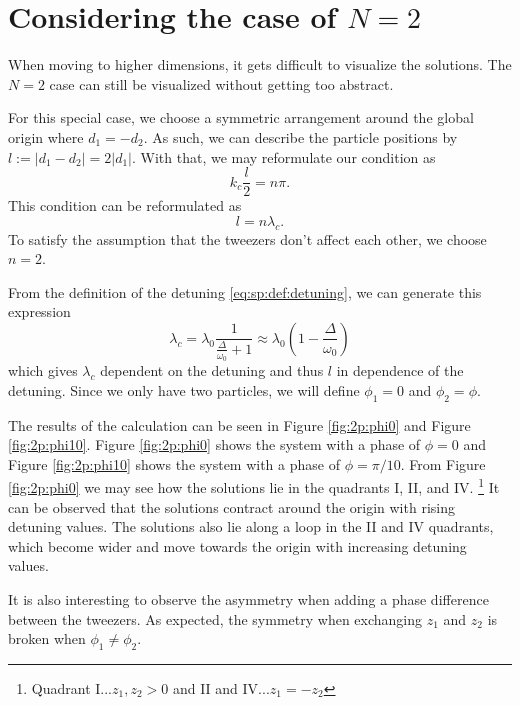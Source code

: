 \chapter{Considering the case of \texorpdfstring{$N=2$}{N=2}}
\label{ch:2p}

When moving to higher dimensions, 
    it gets difficult to visualize the solutions.
The $N=2$ case can still be visualized without getting too abstract.

For this special case, we choose a symmetric arrangement around the global origin where $d_1 = -d_2$.
As such, we can describe the particle positions by $l := |d_1 - d_2| = 2|d_1|$.
With that, we may reformulate our condition as 
\begin{equation}
    k_c \frac l2 = n \pi.
\end{equation}
This condition can be reformulated as
\begin{equation}
    l = n \lambda_c.
\end{equation}
To satisfy the assumption that the tweezers don't affect each other,
    we choose $n=2$.

From the definition of the detuning \eqref{eq:sp:def:detuning},
    we can generate this expression
\begin{equation}
        \lambda_c 
            = \lambda_0 \frac{1}{\frac\Delta{\omega_0} +1} 
            \approx \lambda_0 \left(1 - \frac{\Delta}{\omega_0}\right)
\end{equation}
which gives $\lambda_c$ dependent on the detuning
    and thus $l$ in dependence of the detuning.
Since we only have two particles, we will define $\phi_1 = 0$ and $\phi_2 = \phi$.

The results of the calculation can be seen in Figure \ref{fig:2p:phi0} and Figure \ref{fig:2p:phi10}.
Figure \ref{fig:2p:phi0} shows the system with a phase of $\phi = 0$ 
    and Figure \ref{fig:2p:phi10} shows the system with a phase of $\phi = \pi/10$.
From Figure \ref{fig:2p:phi0} we may see how the solutions lie in the quadrants I, II, and IV. \footnote{
Quadrant I...$z_1, z_2 > 0$ and II and IV...$z_1 = -z_2$
}
It can be observed that the solutions contract around the origin with rising detuning values.
The solutions also lie along a loop in the II and IV quadrants,
    which become wider and move towards the origin with increasing detuning values.

It is also interesting to observe the asymmetry when adding a phase difference between the tweezers.
As expected, the symmetry when exchanging $z_1$ and $z_2$ is broken when $\phi_1 \neq \phi_2$.

